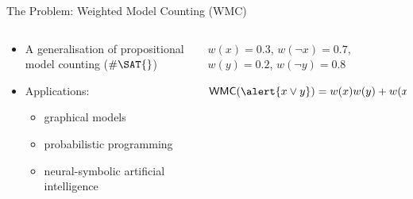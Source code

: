 \documentclass{beamer}
\begin{document}
\begin{frame}{The Problem: Weighted Model Counting (WMC)}
  \begin{columns}
    \begin{column}{0.5\textwidth}
      \begin{itemize}
        \item A generalisation of propositional model counting ($\#\SAT{}$)
        \item Applications:
        \begin{itemize}
          \item graphical models
          \item probabilistic programming
          \item neural-symbolic artificial intelligence
        \end{itemize}
      \end{itemize}
    \end{column}
    \begin{column}{0.5\textwidth}
      \begin{example}
        $w(x) = 0.3$, $w(\neg x) = 0.7$, $w(y) = 0.2$, $w(\neg y) = 0.8$
        \vspace{1cm}

        $\mathsf{WMC}(\alert{x \lor y}) = w(x)w(y) + w(x)w(\neg y) + w(\neg x)w(y) = 0.44$
      \end{example}
    \end{column}
  \end{columns}
\end{frame}
\end{document}
